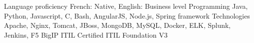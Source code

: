 \begin{cvskills}
  \cvskill
    {Language proficiency}
    {French: Native, English: Business level}
  \cvskill
    {Programming}
    {Java, Python, Javascript, C, Bash, AngularJS, Node.js, Spring framework}
  \cvskill
    {Technologies}
    {Apache, Nginx, Tomcat, JBoss, MongoDB, MySQL, Docker, ELK, Splunk, Jenkins, F5 BigIP}
  \cvskill 
    {ITIL}
    {Certified ITIL Foundation V3}
\end{cvskills}

